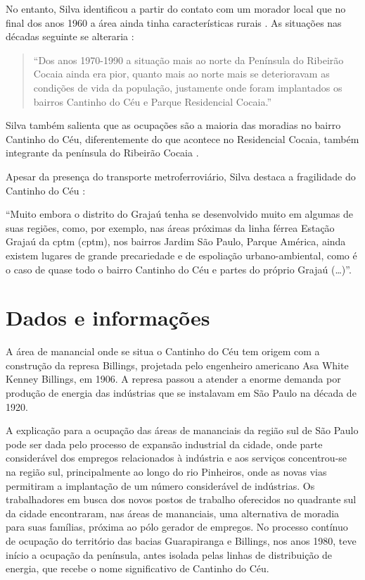 	No entanto, Silva identificou a partir do contato com um morador local que no final dos anos 1960 a área ainda tinha características rurais \cite[p.80]{Silva2016}. As situações nas décadas seguinte se alteraria \cite[p.82]{Silva2016}:
	
	\begin{quote}
		``Dos anos 1970-1990 a situação mais ao norte da Península do Ribeirão Cocaia ainda era pior, quanto mais ao norte mais se deterioravam as condições de vida da população, justamente onde foram implantados os bairros Cantinho do Céu e Parque Residencial Cocaia.''
	\end{quote}
	
	Silva também salienta que as ocupações são a maioria das moradias no bairro Cantinho do Céu, diferentemente do que acontece no Residencial Cocaia, também integrante da península do Ribeirão Cocaia \cite[p.83]{Silva2016}.
	
	Apesar da presença do transporte metroferroviário, Silva destaca a fragilidade do Cantinho do Céu \cite[p.98]{Silva2016}:
	
	\begin{citacao}
		``Muito embora o distrito do Grajaú tenha se desenvolvido muito em algumas de suas regiões, como, por exemplo, nas áreas próximas da linha férrea Estação Grajaú da \glsdesc{cptm} (\gls{cptm}), nos bairros Jardim São Paulo, Parque América, ainda existem lugares de grande	precariedade e de espoliação urbano-ambiental, como é o caso de quase todo o bairro Cantinho do Céu e partes do próprio Grajaú (\dots)''.
	\end{citacao}
	
	\section{Dados e informações}
	
	A área de manancial onde se situa o Cantinho do Céu tem origem com a construção da represa Billings, projetada pelo engenheiro americano Asa White Kenney Billings, em 1906. A represa passou a atender a enorme demanda por produção de energia das indústrias que se instalavam em São Paulo na década de 1920.
	
	A explicação para a ocupação das áreas de mananciais da região sul de São Paulo pode ser dada pelo processo de expansão industrial da cidade, onde parte considerável dos empregos relacionados à indústria e aos serviços concentrou-se na região sul, principalmente ao longo do rio Pinheiros, onde as novas vias permitiram a implantação de um número considerável de indústrias. Os trabalhadores em busca dos novos postos de trabalho oferecidos no quadrante sul da cidade encontraram, nas áreas de mananciais, uma alternativa de moradia para suas famílias, próxima ao pólo gerador de empregos. No processo contínuo de ocupação do território das bacias Guarapiranga e Billings, nos anos 1980, teve início a ocupação da península, antes isolada pelas linhas de distribuição de energia, que recebe o nome significativo de Cantinho do Céu.
	
